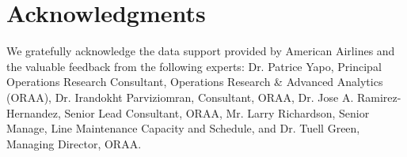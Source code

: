 \documentclass{_main_paper}
\begin{document}
\clearpage

\newpage








\section*{Acknowledgments} 
We gratefully acknowledge the data support provided by American Airlines and the valuable feedback from the following experts:
Dr. Patrice Yapo, Principal Operations Research Consultant, Operations Research \& Advanced Analytics (ORAA),
Dr. Irandokht Parviziomran, Consultant, ORAA,
Dr. Jose A. Ramirez-Hernandez, Senior Lead Consultant, ORAA, 
Mr. Larry Richardson, Senior Manage, Line Maintenance Capacity and Schedule, and 
Dr. Tuell Green, Managing Director, ORAA.








\appendix


\renewcommand{\theequation}{A-\arabic{equation}}
\newpage

% 
 
\end{document}
